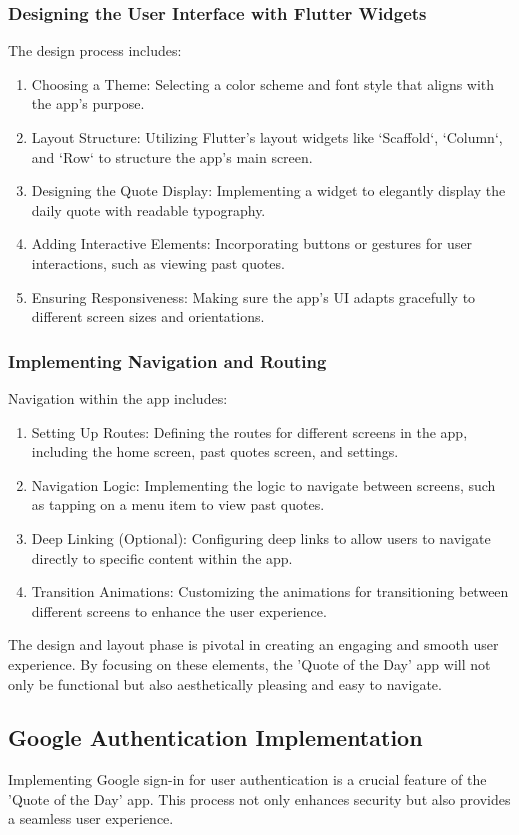 \documentclass{book}
\begin{document}
\subsubsection{Designing the User Interface with Flutter Widgets}
The design process includes:
\begin{enumerate}
    \item Choosing a Theme: Selecting a color scheme and font style that aligns with the app's purpose.
    \item Layout Structure: Utilizing Flutter's layout widgets like `Scaffold`, `Column`, and `Row` to structure the app's main screen.
    \item Designing the Quote Display: Implementing a widget to elegantly display the daily quote with readable typography.
    \item Adding Interactive Elements: Incorporating buttons or gestures for user interactions, such as viewing past quotes.
    \item Ensuring Responsiveness: Making sure the app's UI adapts gracefully to different screen sizes and orientations.
\end{enumerate}

\subsubsection{Implementing Navigation and Routing}
Navigation within the app includes:
\begin{enumerate}
    \item Setting Up Routes: Defining the routes for different screens in the app, including the home screen, past quotes screen, and settings.
    \item Navigation Logic: Implementing the logic to navigate between screens, such as tapping on a menu item to view past quotes.
    \item Deep Linking (Optional): Configuring deep links to allow users to navigate directly to specific content within the app.
    \item Transition Animations: Customizing the animations for transitioning between different screens to enhance the user experience.
\end{enumerate}

The design and layout phase is pivotal in creating an engaging and smooth user experience. By focusing on these elements, the 'Quote of the Day' app will not only be functional but also aesthetically pleasing and easy to navigate.

\subsection{Google Authentication Implementation}
Implementing Google sign-in for user authentication is a crucial feature of the 'Quote of the Day' app. This process not only enhances security but also provides a seamless user experience. 
\end{document}
